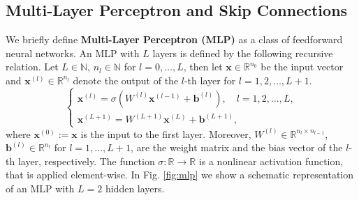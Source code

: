 \documentclass{article}
\newcommand{\R}{\mathbb{R}}
\newcommand{\N}{\mathbb{N}}
\theoremstyle{plain}
\numberwithin{equation}{section}
\begin{document}
\subsection{Multi-Layer Perceptron and Skip Connections}\label{sec:mlp_skip}
We  briefly define \textbf{Multi-Layer Perceptron (MLP)} as a class of feedforward neural networks. An MLP with \( L \) layers is defined by the following recursive relation. Let $L\in \N$, $n_l\in \N$ for $l=0, \dots, L$, then let \( \mathbf{x} \in \R^{n_0} \) be the input vector and \( \mathbf{x}^{(l)} \in \R^{n_l} \) denote the output of the \( l \)-th layer for \( l = 1, 2, \dots, L+1 \).
\[
    \begin{cases}
        \mathbf{x}^{(l)} = \sigma\left(W^{(l)} \mathbf{x}^{(l-1)} + \mathbf{b}^{(l)}\right), \quad l = 1, 2, \dots, L, \\
        \mathbf{x}^{(L+1)} = W^{(L+1)} \mathbf{x}^{(L)} + \mathbf{b}^{(L+1)},
    \end{cases}
\]
where \( \mathbf{x}^{(0)} := \mathbf{x} \) is the input to the first layer. Moreover, \( W^{(l)} \in \R^{n_l \times n_{l-1}}\), \( \mathbf{b}^{(l)} \in \R^{n_l} \) for \( l = 1, \dots, L+1 \), are the weight matrix and the bias vector of the \( l \)-th layer, respectively. The function \( \sigma: \R \to \R \) is a nonlinear activation function, that is applied element-wise. In Fig. \ref{fig:mlp} we show a schematic representation of an MLP with \( L=2 \) hidden layers.
\end{document}
